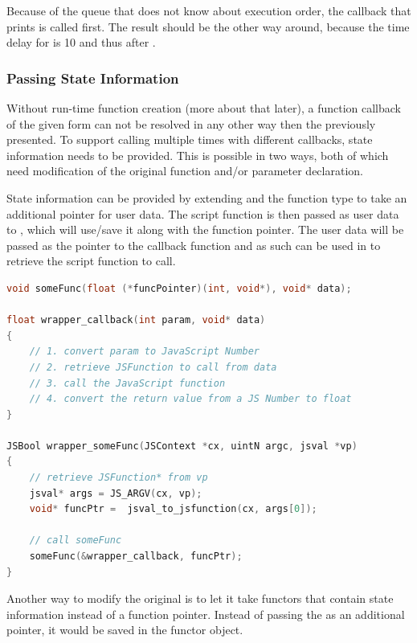 Because of the queue that does not know about execution order, the callback that prints  is called first. The result should be the other way around, because the time delay for  is 10 and thus after . 

\newpage
\subsubsection{Passing State Information}

Without run-time function creation (more about that later), a function callback of the given form can not be resolved in any other way then the previously presented. To support calling  multiple times with different callbacks, state information needs to be provided. This is possible in two ways, both of which need modification of the original function and/or parameter declaration.

State information can be provided by extending  and the function type to take an additional  pointer for user data. The script function is then passed as user data to , which will use/save it along with the function pointer. The user data will be passed as the  pointer to the  callback function and as such can be used in  to retrieve the script function to call.

\SingleSpacing
\begin{lstlisting}[language=C++, caption=Wrapper code for handling methods that take function pointers \#2]
void someFunc(float (*funcPointer)(int, void*), void* data);

float wrapper_callback(int param, void* data)
{
	// 1. convert param to JavaScript Number
	// 2. retrieve JSFunction to call from data
	// 3. call the JavaScript function
	// 4. convert the return value from a JS Number to float
}

JSBool wrapper_someFunc(JSContext *cx, uintN argc, jsval *vp)
{
	// retrieve JSFunction* from vp
	jsval* args = JS_ARGV(cx, vp);
	void* funcPtr =  jsval_to_jsfunction(cx, args[0]);
	
	// call someFunc
	someFunc(&wrapper_callback, funcPtr);
}
\end{lstlisting}
\OnehalfSpacing

Another way to modify the original  is to let it take functors that contain state information instead of a function pointer. Instead of passing the  as an additional  pointer, it would be saved in the functor object.

